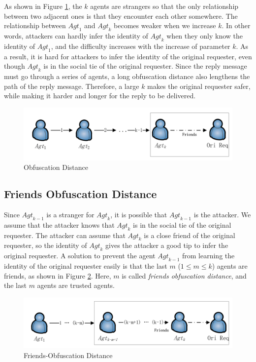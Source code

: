 As shown in Figure \ref{fig:ObfuscationDistance}, the $k$ agents are strangers so that the only relationship between two adjacent ones is that they encounter each other somewhere. The relationship between ${Agt}_1$ and ${Agt}_k$ becomes weaker when we increase $k$. In other words, attackers can hardly infer the identity of ${Agt}_k$ when they only know the identity of ${Agt}_1$, and the difficulty increases with the increase of parameter $k$. As a result, it is hard for attackers to infer the identity of the original requester, even though ${Agt}_k$ is in the social tie of the original requester. Since the reply message must go through a series of agents, a long obfuscation distance also lengthens the path of the reply message. Therefore, a large $k$ makes the original requester safer, while making it harder and longer for the reply to be delivered.

\begin{figure} [hbtp]
\centering 
\includegraphics[width=6.0in]{figures/ACPObfDis.png}
\caption{Obfuscation Distance} 
\label{fig:ObfuscationDistance} %
\end{figure}

\subsection{Friends Obfuscation Distance}

\noindent Since ${Agt}_{k-1}$ is a stranger for ${Agt}_k$, it is possible that ${Agt}_{k-1}$ is the attacker. We assume that the attacker knows that ${Agt}_k$ is in the social tie of the original requester. The attacker can assume that ${Agt}_k$ is a close friend of the original requester, so the identity of ${Agt}_k$ gives the attacker a good tip to infer the original requester. A solution to prevent the agent ${Agt}_{k-1}$ from learning the identity of the original requester easily is that the last $m$ ($1\leq m\leq k$) agents are friends, as shown in Figure \ref{fig:FriObfuscationDistance}. Here, $m$ is called \textit{friends obfuscation distance}, and the last $m$ agents are trusted agents.

\begin{figure} [hbtp]
\centering 
\includegraphics[width=6.0in]{figures/ACPFriObfDis.png}
\caption{Friends-Obfuscation Distance} 
\label{fig:FriObfuscationDistance} %
\end{figure}

